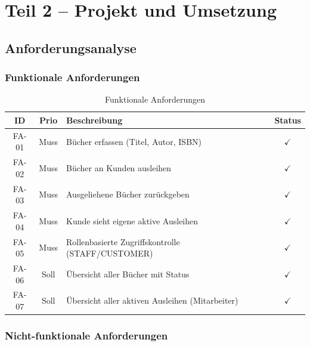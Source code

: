 \documentclass[a4paper,12pt,twoside]{report}
\newcommand{\cmark}{\textcolor{green!60!black}{$\checkmark$}}
\begin{document}
\chapter{Teil 2 -- Projekt und Umsetzung}

\section{Anforderungsanalyse}

\subsection{Funktionale Anforderungen}

\begin{table}[H]
\centering
\caption{Funktionale Anforderungen}
\label{tab:fa}
\begin{tabularx}{\textwidth}{c c X c}
\toprule
\textbf{ID} & \textbf{Prio} & \textbf{Beschreibung} & \textbf{Status} \\
\midrule
FA-01 & Muss & Bücher erfassen (Titel, Autor, ISBN) & \cmark \\
FA-02 & Muss & Bücher an Kunden ausleihen & \cmark \\
FA-03 & Muss & Ausgeliehene Bücher zurückgeben & \cmark \\
FA-04 & Muss & Kunde sieht eigene aktive Ausleihen & \cmark \\
FA-05 & Muss & Rollenbasierte Zugriffskontrolle (STAFF/CUSTOMER) & \cmark \\
FA-06 & Soll & Übersicht aller Bücher mit Status & \cmark \\
FA-07 & Soll & Übersicht aller aktiven Ausleihen (Mitarbeiter) & \cmark \\
\bottomrule
\end{tabularx}
\end{table}

\subsection{Nicht-funktionale Anforderungen}
\end{document}
